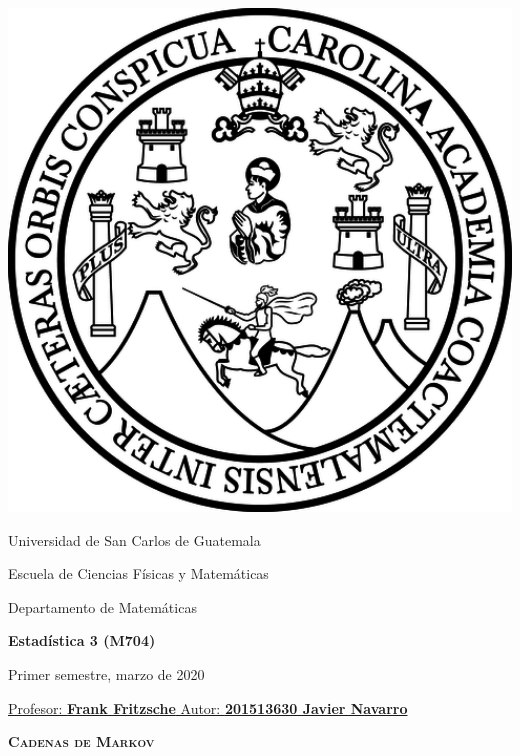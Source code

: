 \documentclass[12pt, letterpaper]{article}
\begin{document}
    \noindent
    \begin{minipage}[l]{0.1\textwidth}
    \noindent
    \includegraphics[width=1.8\textwidth]{logo1.png}
    \end{minipage}
    \hfill
    \begin{minipage}[c]{0.8\textwidth}
    \begin{center}
    {\large	Universidad de San Carlos de Guatemala \par
    \large	Escuela de Ciencias Físicas y Matemáticas	\par
    \large	Departamento de Matemáticas 	\par
    \large \textbf{Estadística 3 (M704)}	\par
    \small	Primer semestre, marzo de 2020}
    \end{center}
    \end{minipage}
    \par
    \vspace{0.2in}
    \noindent
    \uline{Profesor: \textbf{Frank Fritzsche }		\hfill  Autor: \textbf{201513630 Javier Navarro}}
    \par 
    \vspace{0.15in}
    \noindent
    \centering
    {\Large \bfseries 	\textsc{\textbf{Cadenas de Markov}} }\\
    \vspace{0.2in}
\end{document}
